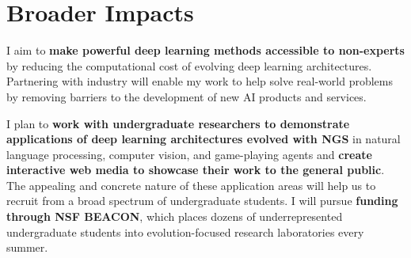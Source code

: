 \section{Broader Impacts}

I aim to \textbf{make powerful deep learning methods accessible to non-experts} by reducing the computational cost of evolving deep learning architectures.
Partnering with industry will enable my work to help solve real-world problems by removing barriers to the development of new AI products and services.

I plan to \textbf{work with undergraduate researchers to demonstrate applications of deep learning architectures evolved with NGS} in natural language processing, computer vision, and game-playing agents and \textbf{create interactive web media to showcase their work to the general public}.
The appealing and concrete nature of these application areas will help us to recruit from a broad spectrum of undergraduate students.
I will pursue \textbf{funding through NSF BEACON}, which places dozens of underrepresented undergraduate students into evolution-focused research laboratories every summer.
